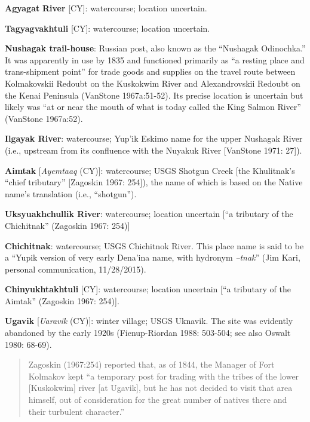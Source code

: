 \begin{hang}
\textbf{Agyagat} \textbf{River} [CY]:\textbf{ }watercourse; location uncertain.



\textbf{Tagyagvakhtuli} [CY]: watercourse; location uncertain.



\textbf{Nushagak trail-house}: Russian post, also known as the “Nushagak Odinochka.” It was apparently in use by 1835 and functioned primarily as “a resting place and trans-shipment point” for trade goods and supplies on the travel route between Kolmakovskii Redoubt on the Kuskokwim River and Alexandrovskii Redoubt on the Kenai Peninsula (VanStone 1967a:51-52). Its precise location is uncertain but likely was “at or near the mouth of what is today called the King Salmon River” (VanStone 1967a:52).



\textbf{Ilgayak River}: watercourse; Yup’ik Eskimo name for the upper Nushagak River (i.e., upstream from its confluence with the Nuyakuk River [VanStone 1971: 27]).



\textbf{Aimtak} [\textit{Ayemtaaq} (CY)]: watercourse; USGS Shotgun Creek [the Khulitnak’s “chief tributary” [Zagoskin 1967: 254]), the name of which is based on the Native name’s translation (i.e., “shotgun”).



\textbf{Uksyuakhchullik River}: watercourse; location uncertain [“a tributary of the Chichitnak” (Zagoskin 1967: 254)]



\textbf{Chichitnak}: watercourse; USGS Chichitnok River. This place name is said to be a “Yupik version of very early Dena’ina name, with hydronym \textit{–tnak}” (Jim Kari, personal communication, 11/28/2015).



\textbf{Chinyukhtakhtuli} [CY]: watercourse; location uncertain [“a tributary of the Aimtak” (Zagoskin 1967: 254)].



\textbf{Ugavik} [\textit{Uaravik} (CY)]: winter village; USGS Uknavik. The site was evidently abandoned by the early 1920s (Fienup-Riordan 1988: 503-504; see also Oswalt 1980: 68-69).



\begin{quote}Zagoskin (1967:254) reported that, as of 1844, the Manager of Fort Kolmakov kept “a temporary post for trading with the tribes of the lower [Kuskokwim] river [at Ugavik], but he has not decided to visit that area himself, out of consideration for the great number of natives there and their turbulent character.”
\end{quote}




\end{hang}
